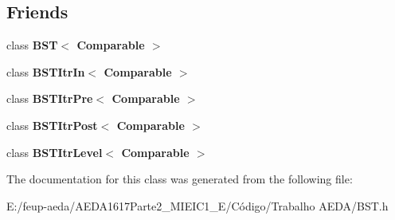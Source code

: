 \subsection*{Friends}
\begin{DoxyCompactItemize}
\item 
\mbox{\label{class_binary_node_a28a1adb9906f3ff7e12c2cb6fa2bd54e}} 
class {\bfseries B\+S\+T$<$ Comparable $>$}
\item 
\mbox{\label{class_binary_node_aab3993acac2ab24a0b59edb0c3acc775}} 
class {\bfseries B\+S\+T\+Itr\+In$<$ Comparable $>$}
\item 
\mbox{\label{class_binary_node_a45a55df6f11541416d4ea7684c575c1a}} 
class {\bfseries B\+S\+T\+Itr\+Pre$<$ Comparable $>$}
\item 
\mbox{\label{class_binary_node_a5dc153694be266f6e772659486219da7}} 
class {\bfseries B\+S\+T\+Itr\+Post$<$ Comparable $>$}
\item 
\mbox{\label{class_binary_node_a26ff00bc0d87069aed877f10fd3c80a8}} 
class {\bfseries B\+S\+T\+Itr\+Level$<$ Comparable $>$}
\end{DoxyCompactItemize}


The documentation for this class was generated from the following file\+:\begin{DoxyCompactItemize}
\item 
E\+:/feup-\/aeda/\+A\+E\+D\+A1617\+Parte2\+\_\+M\+I\+E\+I\+C1\+\_\+\+E/\+Código/\+Trabalho A\+E\+D\+A/B\+S\+T.\+h\end{DoxyCompactItemize}

